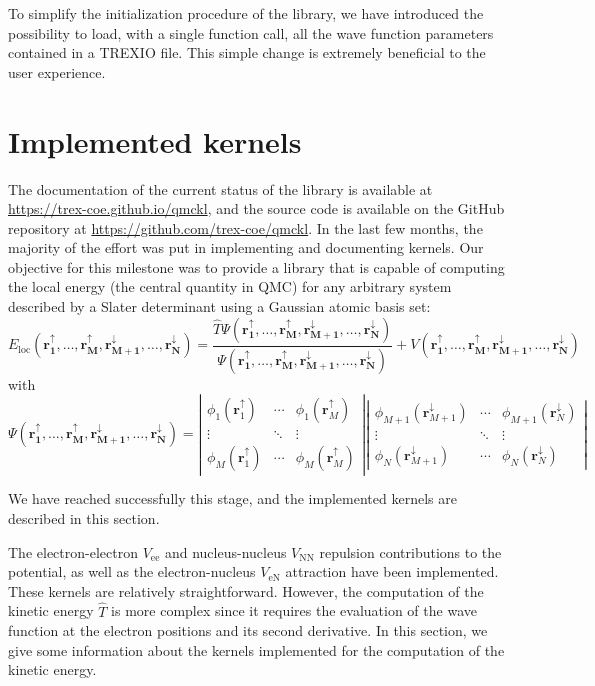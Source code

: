 To simplify the initialization procedure of the library, we have
introduced the possibility to load, with a single function call, all the
wave function parameters contained in a \ac{TREXIO} file. This simple
change is extremely beneficial to the user experience.


\section{Implemented kernels}

The documentation of the current status of the library is available
at \url{https://trex-coe.github.io/qmckl}, and the source code is
available on the GitHub repository at \url{https://github.com/trex-coe/qmckl}.
In the last few months, the majority of the effort was put in
implementing and documenting kernels.  Our objective for this milestone
was to provide a library that is capable of computing the local energy
(the central quantity in \ac{QMC}) for any arbitrary system described
by a Slater determinant using a Gaussian atomic basis set:
\newcommand{\eloc}{E_{\text{loc}}}
\newcommand{\rr}{\mathbf{r_1^\uparrow,\dots,r_M^\uparrow, r_{M+1}^\downarrow,\dots,r_N^\downarrow}}
\[
\eloc\left(\rr\right) = \frac{\hat{T}{\Psi\left(\rr\right)}}{\Psi\left(\rr\right)}
+ V\left(\rr\right)
\]
with
\[
\Psi\left(\mathbf{r_1^\uparrow,\dots,r_M^\uparrow, r_{M+1}^\downarrow,\dots,r_N^\downarrow}\right) = 
\left|
\begin{array}{ccc}
\phi_1\left(\mathbf{r}_1^\uparrow\right) & \cdots & \phi_1\left(\mathbf{r}_M^\uparrow\right) \\
\vdots & \ddots & \vdots \\
\phi_M\left(\mathbf{r}_1^\uparrow\right) & \cdots & \phi_M\left(\mathbf{r}_M^\uparrow\right) 
\end{array}
\right|
\left|
\begin{array}{ccc}
\phi_{M+1}\left(\mathbf{r}_{M+1}^\downarrow\right) & \cdots & \phi_{M+1}\left(\mathbf{r}_N^\downarrow\right) \\
\vdots & \ddots & \vdots \\
\phi_N\left(\mathbf{r}_{M+1}^\downarrow\right) & \cdots & \phi_N\left(\mathbf{r}_N^\downarrow\right) 
\end{array}
\right|
\]

We have reached successfully this stage, and the implemented kernels are
described in this section.

The electron-electron $V_{\text{ee}}$ and nucleus-nucleus $V_{\text{NN}}$
repulsion contributions to the potential, as well as the electron-nucleus
$V_{\text{eN}}$ attraction have been implemented. These kernels are relatively
straightforward. However, the computation of the kinetic energy $\hat{T}$ is
more complex since it requires the evaluation of the wave function at the
electron positions and its second derivative. In this section, we give some
information about the kernels implemented for the computation of the kinetic
energy.


